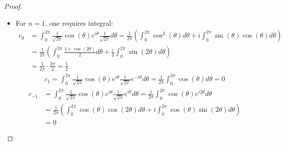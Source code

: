 \documentclass{article}
\begin{document}
\begin{proof}
\begin{itemize}
\begin{itemize}
            \item For $n=1$, one requires integral:
            \begin{align}
                c_0 &= \int_{0}^{2\pi}\frac{1}{\sqrt{2\pi}}\cos(\theta)e^{i\theta}\frac{1}{\sqrt{2\pi}}d\theta = \frac{1}{2\pi}\left(\int_{0}^{2\pi}\cos^2(\theta)d\theta+i\int_{0}^{2\pi}\sin(\theta)\cos(\theta)d\theta\right)\\
                &= \frac{1}{2\pi}\left(\int_{0}^{2\pi}\frac{1+\cos(2\theta)}{2}d\theta+\frac{i}{2}\int_{0}^{2\pi}\sin(2\theta)d\theta\right)\\
                &= \frac{1}{2\pi}\cdot \frac{2\pi}{2} = \frac{1}{2}
            \end{align}
            \begin{align}
                c_1 = \int_{0}^{2\pi}\frac{1}{\sqrt{2\pi}}\cos(\theta)e^{i\theta}\frac{1}{\sqrt{2\pi}}e^{-i\theta}d\theta = \frac{1}{2\pi}\int_{0}^{2\pi}\cos(\theta)d\theta=0
            \end{align}
            \begin{align}
                c_{-1} &= \int_{0}^{2\pi}\frac{1}{\sqrt{2\pi}}\cos(\theta)e^{i\theta}\frac{1}{\sqrt{2\pi}}e^{i\theta}d\theta = \frac{1}{2\pi}\int_{0}^{2\pi}\cos(\theta)e^{i2\theta}d\theta\\
                &= \frac{1}{2\pi}\left(\int_{0}^{2\pi}\cos(\theta)\cos(2\theta)d\theta+i\int_{0}^{2\pi}\cos(\theta)\sin(2\theta)d\theta\right)\\
                &= 0
            \end{align}
            

\end{itemize}
\end{itemize}
\end{proof}
\end{document}
